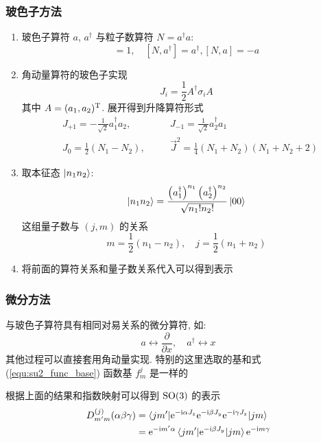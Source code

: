 \documentclass[12pt,a4paper]{article}%
\numberwithin{equation}{section}%
\newcommand\mi{\mathrm{i}}
\newcommand\e{\mathrm{e}}%
\begin{document}
\subsubsection{玻色子方法} %
\label{ssub:boson}
\begin{enumerate}
	\item 玻色子算符 $a$, $a^\dagger$ 与粒子数算符 $N = a^\dagger a$:
	\begin{equation}
		[a,a^\dagger] = 1,\quad [N, a^\dagger] = a^\dagger, [N, a] = -a
	\end{equation}
	\item 角动量算符的玻色子实现
	\begin{equation}
		J_i = \frac 12 A^\dagger \sigma_i A
	\end{equation}
	其中 $A = (a_1, a_2)^\mathrm{T}$. 展开得到升降算符形式
	\begin{align}
		&J_{+1} = -\frac 1{\sqrt 2}a_1^\dagger a_2,\quad &&J_{-1} = \frac 1{\sqrt 2}a_2^\dagger a_1 \\
		&J_0 = \frac 12 (N_1 - N_2), \quad &&\vec J^2 = \frac 14(N_1 + N_2)(N_1 + N_2 + 2)
	\end{align}
	\item 取本征态 $\ket{n_1n_2}$:
	\begin{equation}
		\ket{n_1 n_2} = \frac{\left(a_1^\dagger\right)^{n_1}\left(a_2^\dagger\right)^{n_2}}{\sqrt{n_1!n_2!}}\ket{00}
	\end{equation}
	这组量子数与 $(j,m)$ 的关系
	\begin{equation}
		m = \frac 12(n_1 - n_2),\quad j = \frac 12(n_1 + n_2)
	\end{equation}
	\item 将前面的算符关系和量子数关系代入可以得到表示
\end{enumerate}
\subsubsection{微分方法} %
\label{ssub:calc}
与玻色子算符具有相同对易关系的微分算符, 如:
\begin{equation}
	a\longleftrightarrow \frac{\partial}{\partial x},\quad 
	a^\dagger\longleftrightarrow x
\end{equation}
其他过程可以直接套用角动量实现. 特别的这里选取的基和式(\ref{equ:su2_func_base}) 函数基 $f_m^j$ 是一样的

根据上面的结果和指数映射可以得到 $\mathrm{SO}(3)$ 的表示
\begin{align}
	D_{m'm}^{(j)}(\alpha\beta\gamma) &= \braket{jm'|\e^{-\mi \alpha J_z}\e^{-\mi\beta J_y}\e^{-\mi \gamma J_z}|jm} \\
	&= \e^{-\mi m'\alpha}\braket{jm'|\e^{-\mi\beta J_y}|jm}\e^{-\mi m\gamma}
\end{align}
\end{document}
